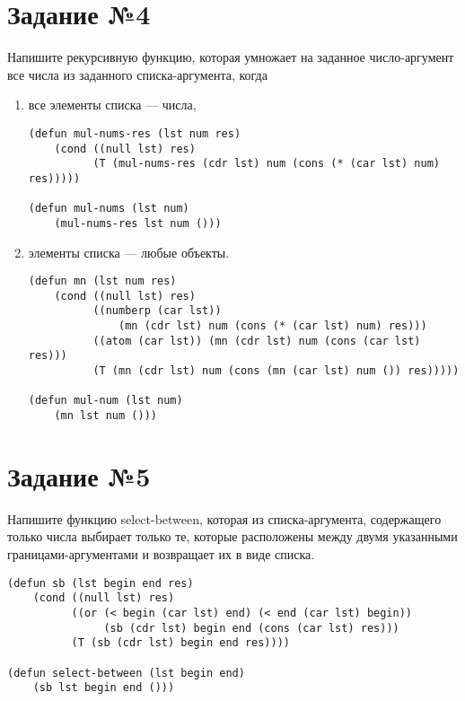 \section{Задание №4}

Напишите рекурсивную функцию, которая умножает на заданное
число-аргумент все числа из заданного списка-аргумента, когда 

\begin{enumerate}
    \item все элементы списка --- числа,

\vspace{4mm}
\begin{minipage}{0.92\linewidth}
\begin{lstlisting}
(defun mul-nums-res (lst num res)
    (cond ((null lst) res)
          (T (mul-nums-res (cdr lst) num (cons (* (car lst) num) res)))))

(defun mul-nums (lst num)
    (mul-nums-res lst num ()))
\end{lstlisting}
\end{minipage}

    \item элементы списка --- любые объекты.

\vspace{4mm}
\begin{minipage}{0.92\linewidth}
\begin{lstlisting}
(defun mn (lst num res)
    (cond ((null lst) res)
          ((numberp (car lst))
              (mn (cdr lst) num (cons (* (car lst) num) res)))
          ((atom (car lst)) (mn (cdr lst) num (cons (car lst) res)))
          (T (mn (cdr lst) num (cons (mn (car lst) num ()) res)))))

(defun mul-num (lst num)
    (mn lst num ()))
\end{lstlisting}
\end{minipage}

\end{enumerate}

\section{Задание №5}

Напишите функцию select-between, которая из списка-аргумента, содержащего только
числа выбирает только те, которые расположены между двумя указанными
границами-аргументами и возвращает их в виде списка.

\vspace{4mm}
\begin{minipage}{0.92\linewidth}
\begin{lstlisting}
(defun sb (lst begin end res)
    (cond ((null lst) res)
          ((or (< begin (car lst) end) (< end (car lst) begin))
               (sb (cdr lst) begin end (cons (car lst) res)))
          (T (sb (cdr lst) begin end res))))

(defun select-between (lst begin end)
    (sb lst begin end ()))
\end{lstlisting}
\end{minipage}

